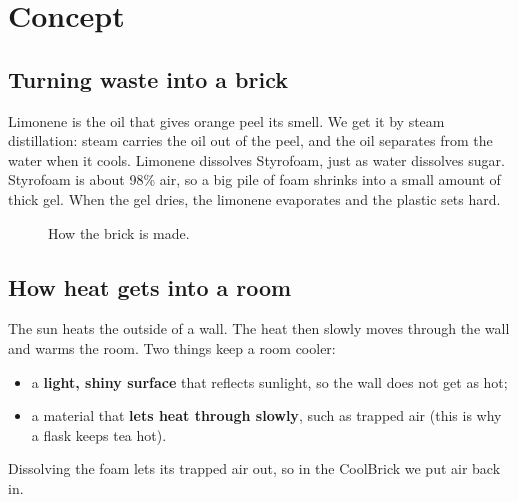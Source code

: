 \documentclass[11pt,a4paper]{article}
\let\origsection\section
\renewcommand{\section}{\clearpage\origsection}
\begin{document}
\section{Concept}

\subsection{Turning waste into a brick}
Limonene is the oil that gives orange peel its smell. We get it by steam
distillation: steam carries the oil out of the peel, and the oil separates
from the water when it cools. Limonene dissolves Styrofoam, just as water
dissolves sugar. Styrofoam is about 98\% air, so a big pile of foam shrinks
into a small amount of thick gel. When the gel dries, the limonene
evaporates and the plastic sets hard.

\begin{figure}[H]
\centering
{}
\caption{How the brick is made.}
\end{figure}

\subsection{How heat gets into a room}
The sun heats the outside of a wall. The heat then slowly moves through the
wall and warms the room. Two things keep a room cooler:
\begin{itemize}
  \item a \textbf{light, shiny surface} that reflects sunlight, so the wall
        does not get as hot;
  \item a material that \textbf{lets heat through slowly}, such as trapped
        air (this is why a flask keeps tea hot).
\end{itemize}
Dissolving the foam lets its trapped air out, so in the CoolBrick we put air
back in.
\end{document}

